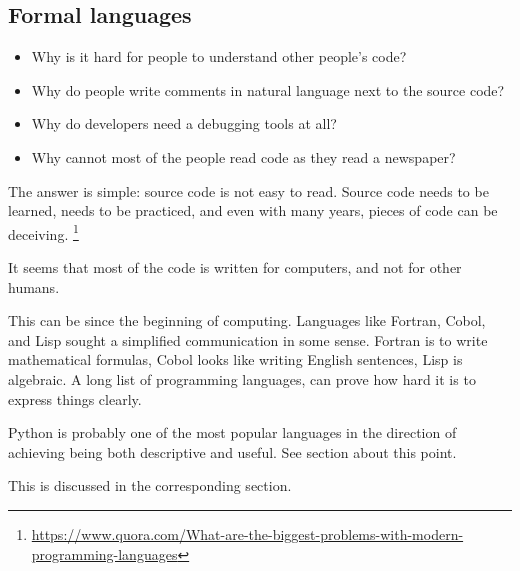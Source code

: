 
\subsection{Formal languages}

\begin{itemize}
    \item Why is it hard for people to understand other people's code?
    \item Why do people write comments in natural language next to the source code?
    \item Why do developers need a debugging tools at all?
    \item Why cannot most of the people read code as they read a newspaper?
\end{itemize}
The answer is simple: source code is not easy to read.
Source code needs to be learned, needs to be practiced, and even with many years, pieces of code can be deceiving.
\footnote{\url{https://www.quora.com/What-are-the-biggest-problems-with-modern-programming-languages}}

It seems that most of the code is written for computers, and not for other humans.

This can be since the beginning of computing.
Languages like Fortran, Cobol, and Lisp sought a simplified communication in some sense.
Fortran is to write mathematical formulas, Cobol looks like writing English sentences, Lisp is algebraic.
A long list of programming languages, can prove how hard it is to express things clearly.

Python is probably one of the most popular languages in the direction of achieving being both descriptive and useful.
See section about this point.

This is discussed in the corresponding section.

